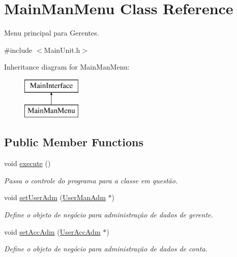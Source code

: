 \hypertarget{classMainManMenu}{\section{Main\-Man\-Menu Class Reference}
\label{d0/d1d/classMainManMenu}
}


Menu principal para Gerentes.  




{\ttfamily \#include $<$Main\-Unit.\-h$>$}

Inheritance diagram for Main\-Man\-Menu\-:\begin{figure}[H]
\begin{center}
\leavevmode
\includegraphics[height=2.000000cm]{d0/d1d/classMainManMenu}
\end{center}
\end{figure}
\subsection*{Public Member Functions}
\begin{DoxyCompactItemize}
\item 
void \hyperlink{classMainManMenu_ac864c18863c5f308d0b9c52c223b4b9c}{execute} ()
\begin{DoxyCompactList}\small\item\em Passa o controle do programa para a classe em questão. \end{DoxyCompactList}\item 
void \hyperlink{classMainManMenu_aa4174687e0614fd63783c39340dfc17e}{set\-User\-Adm} (\hyperlink{classUserManAdm}{User\-Man\-Adm} $\ast$)
\begin{DoxyCompactList}\small\item\em Define o objeto de negócio para administração de dados de gerente. \end{DoxyCompactList}\item 
void \hyperlink{classMainManMenu_a507ebea41371d58e137ece5a11bb63bf}{set\-Acc\-Adm} (\hyperlink{classUserAccAdm}{User\-Acc\-Adm} $\ast$)
\begin{DoxyCompactList}\small\item\em Define o objeto de negócio para administração de dados de conta. \end{DoxyCompactList}\end{DoxyCompactItemize}


